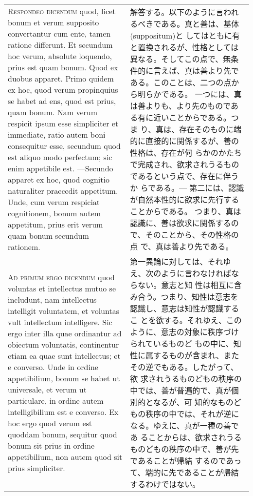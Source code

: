 \documentclass[10pt]{jsarticle} %
\begin{document}
\begin{longtable}{p{21em}p{21em}}
\\

{\scshape Respondeo dicendum} quod, licet bonum et verum supposito
convertantur cum ente, tamen ratione differunt. Et secundum hoc verum,
absolute loquendo, prius est quam bonum. Quod ex duobus apparet.
Primo quidem ex hoc, quod verum propinquius se habet ad ens, quod est
prius, quam bonum. Nam verum respicit ipsum esse simpliciter et
immediate, ratio autem boni consequitur esse, secundum quod est aliquo
modo perfectum; sic enim appetibile est.  ---Secundo apparet ex hoc,
quod cognitio naturaliter praecedit appetitum. Unde, cum verum
respiciat cognitionem, bonum autem appetitum, prius erit verum quam
bonum secundum rationem.

&

解答する。以下のように言われるべきである。真と善は、基体(suppositum)と
してはともに有と置換されるが、性格としては異なる。そしてこの点で、無条
件的に言えば、真は善より先である。このことは、二つの点から明らかである。
一つには、真は善よりも、より先のものである有に近いことからである。つま
り、真は、存在そのものに端的に直接的に関係するが、善の性格は、存在が何
らかのかたちで完成され、欲求されうるものであるという点で、存在に伴うか
らである。--- 第二には、認識が自然本性的に欲求に先行することからである。
つまり、真は認識に、善は欲求に関係するので、そのことから、その性格の点
で、真は善より先である。

\\

{\scshape Ad primum ergo dicendum} quod voluntas et intellectus mutuo
se includunt, nam intellectus intelligit voluntatem, et voluntas vult
intellectum intelligere. Sic ergo inter illa quae ordinantur ad
obiectum voluntatis, continentur etiam ea quae sunt intellectus; et e
converso. Unde in ordine appetibilium, bonum se habet ut universale,
et verum ut particulare, in ordine autem intelligibilium est e
converso. Ex hoc ergo quod verum est quoddam bonum, sequitur quod
bonum sit prius in ordine appetibilium, non autem quod sit prius
simpliciter.

&

第一異論に対しては、それゆえ、次のように言わなければならない。意志と知
性は相互に含み合う。つまり、知性は意志を認識し、意志は知性が認識するこ
とを欲する。それゆえ、このように、意志の対象に秩序づけられているものど
もの中に、知性に属するものが含まれ、またその逆でもある。したがって、欲
求されうるものどもの秩序の中では、善が普遍的で、真が個別的となるが、可
知的なものどもの秩序の中では、それが逆になる。ゆえに、真が一種の善であ
ることからは、欲求されうるものどもの秩序の中で、善が先であることが帰結
するのであって、端的に先であることが帰結するわけではない。


\end{longtable}
\end{document}
